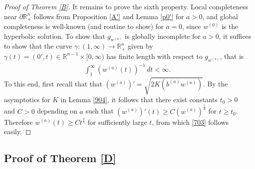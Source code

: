 \documentclass[12pt]{article}
\numberwithin{equation}{section}
\theoremstyle{plain}
\theoremstyle{definition}
\begin{document}
\begin{proof}[Proof of Theorem \ref{B}]
	It remains to prove the sixth property. Local completeness near $\partial\mathbb{R}_+^n$ follows from Proposition \ref{A'} and Lemma \ref{p0'} for $a>0$, and global completeness is well-known (and routine to show) for $a=0$, since $w^{(0)}$ is the hyperbolic solution. To show that $g_{w^{(a)}}$ is globally incomplete for $a>0$, it suffices to show that the curve $\gamma:(1,\infty)\rightarrow \mathbb{R}_+^n$ given by $\gamma(t) = (0',t)\in\mathbb{R}^{n-1}\times[0,\infty)$ has finite length with respect to $g_{w^{(a)}}$, that is
	\begin{align}\label{703}
	\int_1^\infty (w^{(a)}(t))^{-1}\,dt<\infty. 
	\end{align}
	To this end, first recall that that $(w^{(a)})' = \sqrt{2K(b^{(a)}w^{(a)})}$. By the asymptotics for $K$ in Lemma \ref{904}, it follows that there exist constants $t_0>0$ and $C>0$ depending on $a$ such that $(w^{(a)})'(t)   \geq C(w^{(a)})^{\frac{1}{4}}$ for $t \geq t_0$. Therefore $w^{(a)}(t) \geq Ct^{\frac{4}{3}}$ for sufficiently large $t$, from which \eqref{703} follows easily. 
	\end{proof} 



\subsection{Proof of Theorem \ref{D}}
	
	
\end{document}
